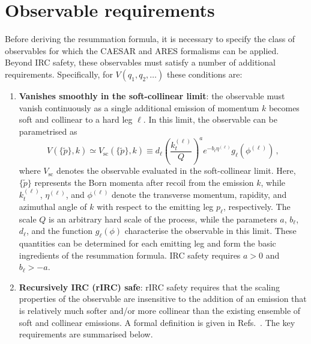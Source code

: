 \section{Observable requirements}
\label{sec:obs-req}

Before deriving the resummation formula, it is necessary to specify the
class of observables for which the \textsc{CAESAR} and \textsc{ARES}
formalisms can be applied. Beyond IRC safety, these observables must satisfy a
number of additional requirements. Specifically, for
$V(q_1,q_2,\dots)$ these conditions are:

\begin{enumerate}
\item \textbf{Vanishes smoothly in the soft-collinear limit}: the observable
must vanish continuously as a single additional emission of momentum $k$
becomes soft and collinear to a hard leg $\ell$. In this limit, the observable
can be parametrised as
\begin{equation}
\label{eq:general-sc-V}
    V(\{\tilde{p}\},k) \simeq V_{\text{sc}}(\{\tilde{p}\},k) 
    \equiv d_\ell\left(\frac{k_t^{(\ell)}}{Q}\right)^a 
    e^{-b_\ell\eta^{(\ell)}} g_\ell(\phi^{(\ell)})\,,
\end{equation}
where $V_{\text{sc}}$ denotes the observable evaluated in the 
soft-collinear limit. Here, $\{\tilde{p}\}$ represents the Born momenta
after recoil from the emission $k$, while
$k_t^{(\ell)}$, $\eta^{(\ell)}$, and $\phi^{(\ell)}$ denote the transverse
momentum, rapidity, and azimuthal angle of $k$ with respect to the emitting
leg $p_\ell$, respectively. The scale $Q$ is an arbitrary hard scale of the process, while 
the parameters $a$,  $b_\ell$, $d_\ell$, and the function $g_\ell(\phi)$ characterise the 
observable in this limit. These quantities
can be determined for each emitting leg and form the basic ingredients
of the resummation formula. IRC safety requires $a > 0$ and 
$b_\ell > -a$.

\item \textbf{Recursively IRC (rIRC) safe}: rIRC safety requires that the
scaling properties of the observable are insensitive to the addition of an emission that is
relatively much softer and/or more collinear than the existing ensemble of
soft and collinear emissions. A formal definition is given in Refs.~\cite{Banfi:2004yd, Banfi:2003je}. The key requirements are summarised below.


\end{enumerate}
